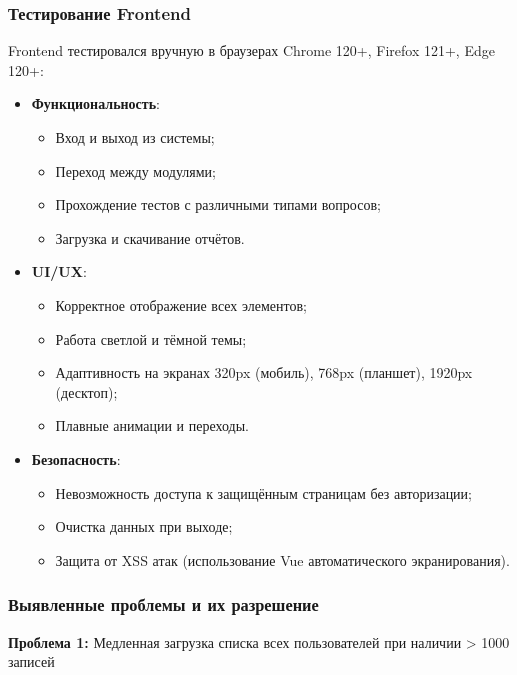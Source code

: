 \subsubsection{Тестирование Frontend}

Frontend тестировался вручную в браузерах Chrome 120+, Firefox 121+, Edge 120+:

\begin{itemize}
    \item \textbf{Функциональность}:
    \begin{itemize}
        \item Вход и выход из системы;
        \item Переход между модулями;
        \item Прохождение тестов с различными типами вопросов;
        \item Загрузка и скачивание отчётов.
    \end{itemize}
    
    \item \textbf{UI/UX}:
    \begin{itemize}
        \item Корректное отображение всех элементов;
        \item Работа светлой и тёмной темы;
        \item Адаптивность на экранах 320px (мобиль), 768px (планшет), 1920px (десктоп);
        \item Плавные анимации и переходы.
    \end{itemize}
    
    \item \textbf{Безопасность}:
    \begin{itemize}
        \item Невозможность доступа к защищённым страницам без авторизации;
        \item Очистка данных при выходе;
        \item Защита от XSS атак (использование Vue автоматического экранирования).
    \end{itemize}
\end{itemize}

\subsubsection{Выявленные проблемы и их разрешение}

\textbf{Проблема 1:} Медленная загрузка списка всех пользователей при наличии > 1000 записей

